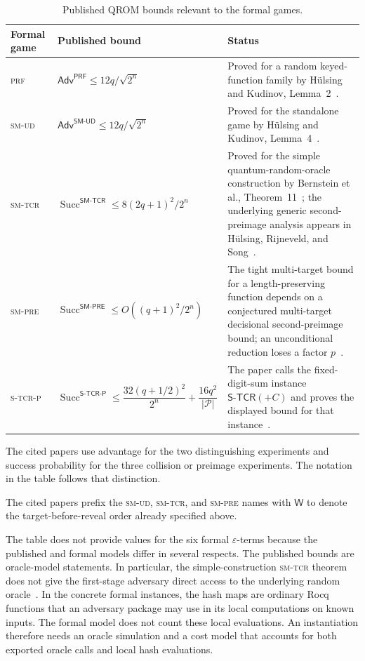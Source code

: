 \documentclass[11pt,a4paper]{article}
\theoremstyle{plain}
\theoremstyle{definition}
\newcommand{\Adv}{\mathsf{Adv}}
\newcommand{\prf}{\textsc{prf}\xspace}
\newcommand{\smud}{\textsc{sm-ud}\xspace}
\newcommand{\smtcr}{\textsc{sm-tcr}\xspace}
\newcommand{\smpre}{\textsc{sm-pre}\xspace}
\newcommand{\stcrp}{\textsc{s-tcr-p}\xspace}
\begin{document}
\begin{table}[H]
\centering
\small
\caption{Published QROM bounds relevant to the formal games.}
\label{tab:published-bounds}
\begin{tabular}{L{2.0cm}L{6.1cm}L{6.5cm}}
\toprule
Formal game & Published bound & Status \\
\midrule
\prf
  & \(\Adv^{\mathsf{PRF}}\leq 12q/\sqrt{2^n}\)
  & Proved for a random keyed-function family by H\"ulsing and Kudinov, Lemma~2~\cite{HulsingKudinov2022}. \\
\smud
  & \(\Adv^{\mathsf{SM\text{-}UD}}\leq 12q/\sqrt{2^n}\)
  & Proved for the standalone game by H\"ulsing and Kudinov, Lemma~4~\cite{HulsingKudinov2022}. \\
\smtcr
  & \(\operatorname{Succ}^{\mathsf{SM\text{-}TCR}}\leq 8(2q+1)^2/2^n\)
  & Proved for the simple quantum-random-oracle construction by Bernstein et al., Theorem~11~\cite{BernsteinEtAl2019Sphincs}; the underlying generic second-preimage analysis appears in H\"ulsing, Rijneveld, and Song~\cite{HulsingRijneveldSong2016}. \\
\smpre
  & \(\operatorname{Succ}^{\mathsf{SM\text{-}PRE}}\leq O((q+1)^2/2^n)\)
  & The tight multi-target bound for a length-preserving function depends on a conjectured multi-target decisional second-preimage bound; an unconditional reduction loses a factor \(p\)~\cite{BernsteinHulsing2019DSPR,HulsingKudinov2022}. \\
\stcrp
  & \(\operatorname{Succ}^{\mathsf{S\text{-}TCR\text{-}P}}\leq \dfrac{32(q+1/2)^2}{2^n}+\dfrac{16q^2}{|\mathcal P|}\)
  & The paper calls the fixed-digit-sum instance \(\mathsf{S\text{-}TCR}(+C)\) and proves the displayed bound for that instance~\cite{hulsing2023sphincs+}. \\
\bottomrule
\end{tabular}
\end{table}

The cited papers use advantage for the two distinguishing experiments and success probability for the three collision or preimage experiments.
The notation in the table follows that distinction.

The cited papers prefix the \smud, \smtcr, and \smpre names with \(\mathsf{W}\) to denote the target-before-reveal order already specified above.

The table does not provide values for the six formal \(\varepsilon\)-terms because the published and formal models differ in several respects.
The published bounds are oracle-model statements.
In particular, the simple-construction \smtcr theorem does not give the first-stage adversary direct access to the underlying random oracle~\cite[Theorem~11]{BernsteinEtAl2019Sphincs}.
In the concrete formal instances, the hash maps are ordinary Rocq functions that an adversary package may use in its local computations on known inputs.
The formal model does not count these local evaluations.
An instantiation therefore needs an oracle simulation and a cost model that accounts for both exported oracle calls and local hash evaluations.
\end{document}
